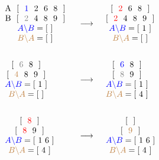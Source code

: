 \documentclass[oneside,12pt]{book}
\begin{document}
\begin{align*}
&\begin{array}{c}
$A \ [ \ {\color{blue}1} \ 2 \ 6  \ 8 \ ]$\\
$B \ [ \ {\color{gray}2} \ 4  \ 8 \ 9 \ ]$\\
{\color{blue}A \backslash B} = [ \ ]\\
{\color{brown}B \backslash A} = [ \ ]
\end{array}&
&\longrightarrow&
&\begin{array}{c}
$[ \ {\color{red}2} \ 6  \ 8 \ ]$\\
$[ \ {\color{red}2} \ 4   \ 8 \ 9 \ ]$\\
{\color{blue}A \backslash B} = [ \ 1 \ ]\\
{\color{brown}B \backslash A} = [ \ ]
\end{array}\\
\\
&\begin{array}{c}
$[ \  {\color{gray}6}  \ 8 \ ]$\\
$[ \  {\color{brown}4}  \ 8 \ 9 \ ]$\\
{\color{blue}A \backslash B} = [ \ 1 \ ]\\
{\color{brown}B \backslash A} = [ \ ]
\end{array}&
&\longrightarrow&
&\begin{array}{c}
$[ \  {\color{blue}6}  \ 8 \ ]$\\
$[  \ {\color{gray}8} \ 9 \ ]$\\
{\color{blue}A \backslash B} = [ \ 1 \ ]\\
{\color{brown}B \backslash A} = [ \ 4 \ ]
\end{array}\\
\\
&\begin{array}{c}
$[   \ {\color{red}8} \ ]$\\
$[  \ {\color{red}8} \ 9 \ ]$\\
{\color{blue}A \backslash B} = [ \ 1 \ 6 \ ]\\
{\color{brown}B \backslash A} = [ \ 4 \ ]
\end{array}&
&\longrightarrow&
&\begin{array}{c}
$[  \ ]$\\
$[  \ {\color{brown}9} \ ]$\\
{\color{blue}A \backslash B} = [ \ 1 \ 6 \ ]\\
{\color{brown}B \backslash A} = [ \ 4 \ ]
\end{array}
\end{align*}
\end{document}
